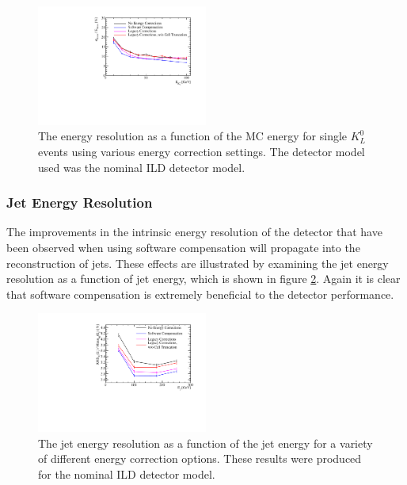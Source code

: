 \begin{figure}
\includegraphics[width=0.5\textwidth]{EnergyEstimators/Plots/SoftComp/EnergyResolution/ER_vs_Kaon0LSoftComp_Kaon0L.pdf}
\caption[The energy resolution as a function of the MC energy for single $K^{0}_{L}$ events using various energy correction settings.  The detector model used was the nominal ILD detector model.]{The energy resolution as a function of the MC energy for single $K^{0}_{L}$ events using various energy correction settings.  The detector model used was the nominal ILD detector model.}
\label{fig:ersoftcomp}
\end{figure}


\subsubsection{Jet Energy Resolution}

The improvements in the intrinsic energy resolution of the detector that have been observed when using software compensation will propagate into the reconstruction of jets.  These effects are illustrated by examining the jet energy resolution as a function of jet energy, which is shown in figure \ref{fig:jersoftcomp}.  Again it is clear that software compensation is extremely beneficial to the detector performance.  

\begin{figure}
\includegraphics[width=0.5\textwidth]{EnergyEstimators/Plots/SoftComp/JetEnergyResolution/JER_vs_JetEnergy_Default.pdf}
\caption[The jet energy resolution as a function of the jet energy for a variety of different energy correction options.  These results were produced for the nominal ILD detector model.]{The jet energy resolution as a function of the jet energy for a variety of different energy correction options.  These results were produced for the nominal ILD detector model.}
\label{fig:jersoftcomp}
\end{figure}

